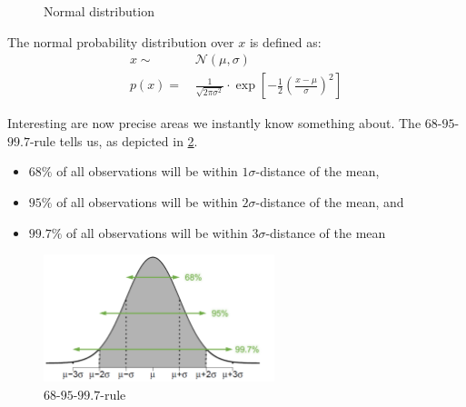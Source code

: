 \begin{figure}[H]
  \centering
  \hspace*{0.05\textwidth}
  \caption{Normal distribution}
  \label{fig:2_normal}
\end{figure}

The normal probability distribution over $x$ is defined as:
\begin{align*}
  x \sim&\, \mathcal{N}(\mu, \sigma) \\
  p(x) = &\,\frac{1}{\sqrt{2\pi \sigma^2}} \cdot \exp\left[ -\frac{1}{2}\left(\frac{x-\mu}{\sigma}\right)^2 \right]
\end{align*}

Interesting are now precise areas we instantly know something about. The $68$-$95$-$99.7$-rule tells us, as depicted in \ref{fig:2_three_sigma}.
\begin{itemize}
  \item $68\%$ of all observations will be within $1\sigma$-distance of the mean,
  \item $95\%$ of all observations will be within $2\sigma$-distance of the mean, and
  \item $99.7\%$ of all observations will be within $3\sigma$-distance of the mean
\end{itemize}

\begin{figure}[H]
  \centering
  \includegraphics[width=0.6\textwidth]{assets/visualization_and_extraction/norm_rule.png}
  \caption{$68$-$95$-$99.7$-rule}
  \label{fig:2_three_sigma}
\end{figure}

